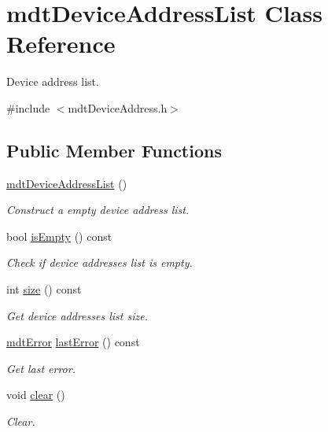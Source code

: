 \hypertarget{classmdt_device_address_list}{\section{mdt\-Device\-Address\-List Class Reference}
\label{classmdt_device_address_list}
}


Device address list.  




{\ttfamily \#include $<$mdt\-Device\-Address.\-h$>$}

\subsection*{Public Member Functions}
\begin{DoxyCompactItemize}
\item 
\hyperlink{classmdt_device_address_list_a6007c5d6c9f0cb69f88bb9c331b2758e}{mdt\-Device\-Address\-List} ()
\begin{DoxyCompactList}\small\item\em Construct a empty device address list. \end{DoxyCompactList}\item 
bool \hyperlink{classmdt_device_address_list_ae9173d74a97c82dc7459de35db7a0e98}{is\-Empty} () const 
\begin{DoxyCompactList}\small\item\em Check if device addresses list is empty. \end{DoxyCompactList}\item 
int \hyperlink{classmdt_device_address_list_a605e80070800e896a42eb0e12178060e}{size} () const 
\begin{DoxyCompactList}\small\item\em Get device addresses list size. \end{DoxyCompactList}\item 
\hyperlink{classmdt_error}{mdt\-Error} \hyperlink{classmdt_device_address_list_ad4a3b71021684a3388a4610dbd71dbe6}{last\-Error} () const 
\begin{DoxyCompactList}\small\item\em Get last error. \end{DoxyCompactList}\item 
void \hyperlink{classmdt_device_address_list_a6154d2459206808eababac338b445133}{clear} ()
\begin{DoxyCompactList}\small\item\em Clear. \end{DoxyCompactList}\item 

\end{DoxyCompactItemize}
